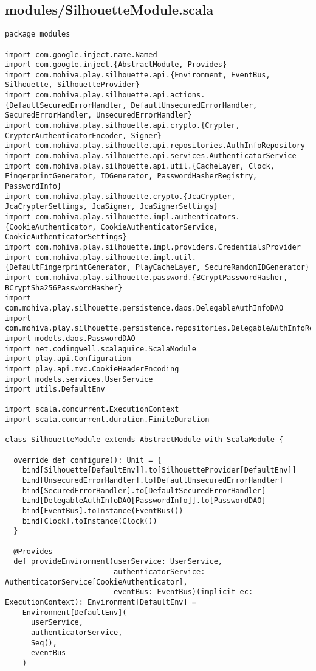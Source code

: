 \subsection{modules/SilhouetteModule.scala}
\begin{lstlisting}
package modules

import com.google.inject.name.Named
import com.google.inject.{AbstractModule, Provides}
import com.mohiva.play.silhouette.api.{Environment, EventBus, Silhouette, SilhouetteProvider}
import com.mohiva.play.silhouette.api.actions.{DefaultSecuredErrorHandler, DefaultUnsecuredErrorHandler, SecuredErrorHandler, UnsecuredErrorHandler}
import com.mohiva.play.silhouette.api.crypto.{Crypter, CrypterAuthenticatorEncoder, Signer}
import com.mohiva.play.silhouette.api.repositories.AuthInfoRepository
import com.mohiva.play.silhouette.api.services.AuthenticatorService
import com.mohiva.play.silhouette.api.util.{CacheLayer, Clock, FingerprintGenerator, IDGenerator, PasswordHasherRegistry, PasswordInfo}
import com.mohiva.play.silhouette.crypto.{JcaCrypter, JcaCrypterSettings, JcaSigner, JcaSignerSettings}
import com.mohiva.play.silhouette.impl.authenticators.{CookieAuthenticator, CookieAuthenticatorService, CookieAuthenticatorSettings}
import com.mohiva.play.silhouette.impl.providers.CredentialsProvider
import com.mohiva.play.silhouette.impl.util.{DefaultFingerprintGenerator, PlayCacheLayer, SecureRandomIDGenerator}
import com.mohiva.play.silhouette.password.{BCryptPasswordHasher, BCryptSha256PasswordHasher}
import com.mohiva.play.silhouette.persistence.daos.DelegableAuthInfoDAO
import com.mohiva.play.silhouette.persistence.repositories.DelegableAuthInfoRepository
import models.daos.PasswordDAO
import net.codingwell.scalaguice.ScalaModule
import play.api.Configuration
import play.api.mvc.CookieHeaderEncoding
import models.services.UserService
import utils.DefaultEnv

import scala.concurrent.ExecutionContext
import scala.concurrent.duration.FiniteDuration

class SilhouetteModule extends AbstractModule with ScalaModule {

  override def configure(): Unit = {
    bind[Silhouette[DefaultEnv]].to[SilhouetteProvider[DefaultEnv]]
    bind[UnsecuredErrorHandler].to[DefaultUnsecuredErrorHandler]
    bind[SecuredErrorHandler].to[DefaultSecuredErrorHandler]
    bind[DelegableAuthInfoDAO[PasswordInfo]].to[PasswordDAO]
    bind[EventBus].toInstance(EventBus())
    bind[Clock].toInstance(Clock())
  }

  @Provides
  def provideEnvironment(userService: UserService,
                         authenticatorService: AuthenticatorService[CookieAuthenticator],
                         eventBus: EventBus)(implicit ec: ExecutionContext): Environment[DefaultEnv] =
    Environment[DefaultEnv](
      userService,
      authenticatorService,
      Seq(),
      eventBus
    )


\end{lstlisting}
